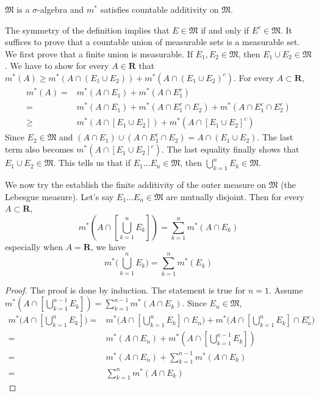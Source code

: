 \vspace{2ex}
\begin{thm}
$\mathfrak{M}$ is a $\sigma $-algebra and $m^{*}$ satisfies countable additivity on $\mathfrak{M}$.
\end{thm}
\vspace{2ex}
\begin{lem}
The symmetry of the definition implies that $E\in \mathfrak{M}$ if and only if $E^{c}\in \mathfrak{M}$. It suffices to prove that a countable union of measurable sets is a measurable set. We first prove that a finite union is measurable. If $E_1,E_2\in \mathfrak{M}$, then $E_1\cup E_2\in \mathfrak{M}$. We have to show for every $A\in {\bm R}$ that $m^{*}(A)\geq m^{*}(A\cap(E_1\cup E_{2}))+m^{*}(A\cap (E_1\cup E_{2})^{c})$. For every $A\subset {\bm R}$, 
\begin{align*}
	m^{*}(A)=&m^{*}(A\cap E_1)+m^{*}(A\cap E_{1}^{c})\\
	=&m^{*}(A\cap E_1)+m^{*}(A\cap E_{1}^{c}\cap E_{2})+m^{*}(A\cap E_{1}^{c}\cap E_{2}^{c})\\
	\geq& m^{*}(A\cap [E_1\cup E_2])+m^{*}(A\cap [E_1\cup  E_2]^{c})
\end{align*}
Since $E_{2}\in \mathfrak{M}$ and $(A\cap E_1)\cup (A\cap E_1^{c}\cap E_{2})=A\cap (E_1\cup E_2)$. The last term also becomes $m^{*}(A\cap [E_{1}\cup E_{2}]^{c})$. The last equality finally shows that $E_1\cup E_2\in \mathfrak{M}$. This tells us that if $E_1\ldots E_{n}\in \mathfrak{M}$, then $\bigcup_{k=1}^{n}E_{k}\in \mathfrak{M}$.
\end{lem}
\vspace{2ex}
\begin{lem}
We now try the establish the finite additivity of the outer measure on $\mathfrak{M}$ (the Lebesgue measure). Let's say $E_1\ldots E_{n}\in \mathfrak{M}$ are mutually disjoint. Then for every $A\subset {\bm R}$,
\[m^{*}(A\cap[\bigcup^{n}_{k=1}E_{k}])=\sum ^{n}_{k=1}m^{*}(A\cap E_{k})\]
especially when $A={\bm R}$, we have
\[m^{*}\Big(\bigcup^{n}_{k=1}E_{k}\Big)=\sum ^{n}_{k=1}m^{*}(E_{k})\]
\end{lem}
\vspace{2ex}
\begin{proof}
The proof is done by induction. The statement is true for $n=1$. Assume $m^{*}(A\cap [\bigcup_{k=1}^{n-1}E_{k}])=\sum ^{n-1}_{k=1}m^{*}(A\cap E_{k})$. Since $E_{n}\in \mathfrak{M}$,
\begin{align*}
m^{*}\Big(A\cap [\bigcup ^{n}_{k=1}E_{k}] \Big)=&m^{*}\Big(A\cap [\bigcup^{n}_{k=1}E_{k}]\cap  E_{n}\Big)+m^{*}\Big(A\cap [\bigcup^{n}_{k=1}E_{k}]\cap E_{n}^{c}\Big)\\
=&m^{*}(A\cap E_{n})+m^{*}(A\cap [\bigcup^{n-1}_{k=1}E_{k}])\\
=&m^{*}(A\cap E_{n})+\sum _{k=1}^{n-1}m^{*}(A\cap E_{k})\\
=&\sum ^{n}_{k=1}m^{*}(A\cap E_{k})
\end{align*}
\end{proof}
\vspace{2ex}

